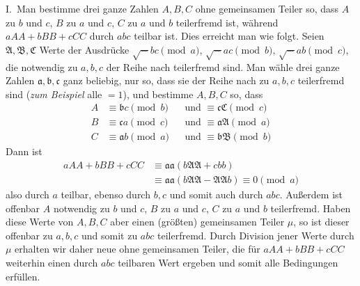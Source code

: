I.\ Man bestimme drei ganze Zahlen \(A,B,C\) ohne gemeinsamen Teiler
so, dass \(A\) zu \(b\) und \(c\), \(B\) zu \(a\) und
\(c\), \(C\) zu \(a\) und \(b\) teilerfremd ist, während
\(aAA+bBB+cCC\) durch \(abc\) teilbar ist. Dies erreicht man wie folgt.
Seien \(\mathfrak A,\mathfrak B,\mathfrak C\) Werte der Ausdrücke \(\surd-bc\pmod a\), \(\surd-ac\pmod b\), \(\surd-ab\pmod c\),
die notwendig zu \(a,b,c\) der Reihe nach teilerfremd sind. Man
wähle drei ganze Zahlen \(\mathfrak a,\mathfrak b,\mathfrak c\) ganz beliebig, nur so, dass sie
der Reihe nach zu \(a,b,c\) teilerfremd sind (\textit{zum Beispiel}
alle \(=1\)), und bestimme \(A,B,C\) so, dass
\[
\begin{aligned}
A&\equiv\mathfrak b c\pmod b&&\text{und }\equiv\mathfrak c\mathfrak C\pmod c\\
B&\equiv\mathfrak c a\pmod c&&\text{und }\equiv\mathfrak a\mathfrak A\pmod a\\
C&\equiv\mathfrak a b\pmod a&&\text{und }\equiv\mathfrak b\mathfrak B\pmod b
\end{aligned}
\]
Dann ist
\[
\begin{aligned}
aAA+bBB+cCC&\equiv\mathfrak a\mathfrak a(b\mathfrak A\mathfrak A+cbb)\\
&\equiv\mathfrak a\mathfrak a(b\mathfrak A\mathfrak A-\mathfrak A\mathfrak A b)\equiv0\pmod a
\end{aligned}
\]
also durch \(a\) teilbar, ebenso durch \(b,c\) und somit auch
durch \(abc\). Außerdem ist offenbar \(A\) notwendig zu \(b\)
und \(c\), \(B\) zu \(a\) und \(c\), \(C\) zu \(a\)
und \(b\) teilerfremd. Haben diese Werte von \(A,B,C\) aber einen
(größten) gemeinsamen Teiler \(\mu\), so ist dieser offenbar
zu \(a,b,c\) und somit zu \(abc\) teilerfremd. Durch Division
jener Werte durch \(\mu\) erhalten wir daher neue ohne gemeinsamen
Teiler, die für \(aAA+bBB+cCC\) weiterhin einen durch \(abc\) teilbaren
Wert ergeben und somit alle Bedingungen erfüllen.

